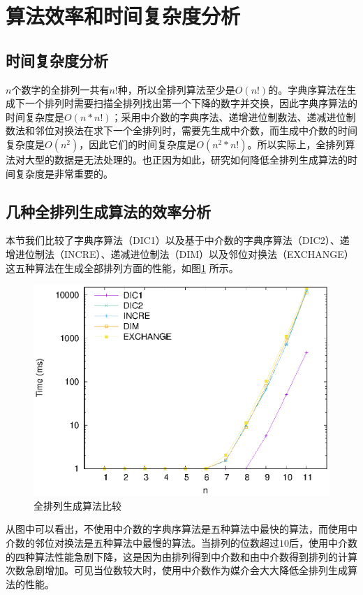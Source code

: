 \documentclass[10pt, twocolumn]{ctexart}
\begin{document}
\section{算法效率和时间复杂度分析}
\subsection{时间复杂度分析}
$n$个数字的全排列一共有$n!$种，所以全排列算法至少是$O(n!)$的。字典序算法在生成下一个排列时需要扫描全排列找出第一个下降的数字并交换，因此字典序算法的时间复杂度是$O(n*n!)$；采用中介数的字典序法、递增进位制数法、递减进位制数法和邻位对换法在求下一个全排列时，需要先生成中介数，而生成中介数的时间复杂度是$O(n^2)$，因此它们的时间复杂度是$O(n^2*n!)$。所以实际上，全排列算法对大型的数据是无法处理的。也正因为如此，研究如何降低全排列生成算法的时间复杂度是非常重要的。


\subsection{几种全排列生成算法的效率分析}
本节我们比较了字典序算法（DIC1）以及基于中介数的字典序算法（DIC2）、递增进位制法（INCRE）、递减进位制法（DIM）以及邻位对换法（EXCHANGE）这五种算法在生成全部排列方面的性能，如图\ref{quan_experiment} 所示。
\begin{figure}[H]
\centering
\includegraphics[width=1\columnwidth]{pictures/quan.eps}
\caption{全排列生成算法比较}
\label{quan_experiment}
\end{figure}

从图中可以看出，不使用中介数的字典序算法是五种算法中最快的算法，而使用中介数的邻位对换法是五种算法中最慢的算法。当排列的位数超过$10$后，使用中介数的四种算法性能急剧下降，这是因为由排列得到中介数和由中介数得到排列的计算次数急剧增加。可见当位数较大时，使用中介数作为媒介会大大降低全排列生成算法的性能。
\end{document}
